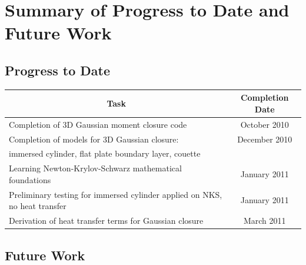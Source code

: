 \documentclass[titlepage,11pt,letterpaper]{article}
\begin{document}
\section{Summary of Progress to Date and Future Work}

\subsection{Progress to Date}

\begin{tabular}{|l|c|} \hline
\multicolumn{1}{|c|}{\bf{Task}} & \multicolumn{1}{|c|}{\bf{Completion Date}} \\

\hline Completion of 3D Gaussian moment closure code & October 2010 \\

\hline Completion of models for 3D Gaussian closure: & December 2010 \\ 
immersed cylinder, flat plate boundary layer, couette &\\

\hline Learning Newton-Krylov-Schwarz mathematical foundations & January 2011 \\

\hline Preliminary testing for immersed cylinder applied on NKS, no heat transfer & January 2011 \\

\hline Derivation of heat transfer terms for Gaussian closure & March 2011 \\

\hline
\end{tabular}

\subsection{Future Work}
\end{document}

